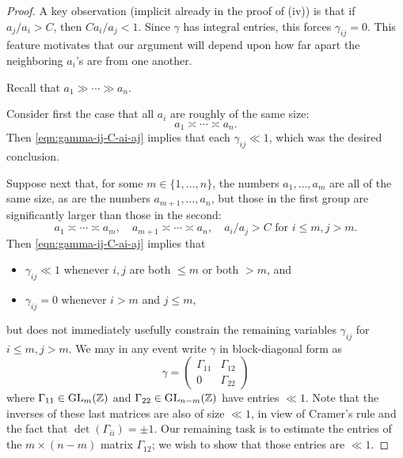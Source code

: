 \documentclass[reqno]{amsart} 
\begin{document}
\begin{proof}
  A key observation (implicit already in the proof of (iv)) is that if $a_j / a_{i} > C$, then $C a_i / a_j < 1$.  Since $\gamma$ has integral entries, this forces $\gamma_{i j} = 0$.  This feature motivates that our argument will depend upon how far apart the neighboring $a_i$'s are from one another.

  Recall that $a_1 \gg \dotsb \gg a_n$.

  Consider first the case that all $a_i$ are roughly of the same size:
  \begin{equation*}
    a_1 \asymp \dotsb \asymp a_n.
  \end{equation*}
  Then \eqref{eqn:gamma-ij-C-ai-aj} implies that each $\gamma_{i j} \ll 1$, which was the desired conclusion.


  Suppose next that, for some $m \in \{1, \dotsc, n\}$, the numbers $a_1,\dotsc,a_m$ are all of the same size, as are the numbers $a_{m+1},\dotsc,a_n$, but those in the first group are significantly larger than those in the second:
  \begin{equation}\label{eqn:two-groups-ai}
    a_1 \asymp \dotsb \asymp a_m,
    \quad
    a_{m+1} \asymp \dotsb \asymp a_n,
    \quad
    a_i / a_j > C
    \text{ for } i \leq m, j > m.
  \end{equation}
  Then \eqref{eqn:gamma-ij-C-ai-aj} implies that
  \begin{itemize}
  \item $\gamma_{i j} \ll 1$ whenever $i,j$ are both $\leq m$ or both $> m$, and
  \item $\gamma_{i j} = 0$ whenever $i > m$ and $j \leq m$,
  \end{itemize}
  but does not immediately usefully constrain the remaining variables $\gamma_{i j}$ for $i \leq m, j > m$.  We may in any event write $\gamma$ in block-diagonal form as
  \begin{equation*}
    \gamma =
    \begin{pmatrix}
      \Gamma_{1 1} &  \Gamma_{1 2} \\
      0 & \Gamma_{2 2}
    \end{pmatrix}
  \end{equation*}
  where $\Gamma_{11} \in \operatorname{GL}_m(\mathbb{Z})$ and $\Gamma_{2 2} \in \operatorname{GL}_{n-m}(\mathbb{Z})$ have entries $\ll 1$.  Note that the inverses of these last matrices are also of size $\ll 1$, in view of Cramer's rule and the fact that $\det(\Gamma_{i i}) = \pm 1$.  Our remaining task is to estimate the entries of the $m \times (n-m)$ matrix $\Gamma_{1 2}$; we wish to show that those entries are $\ll 1$.


\end{proof}
\end{document}
